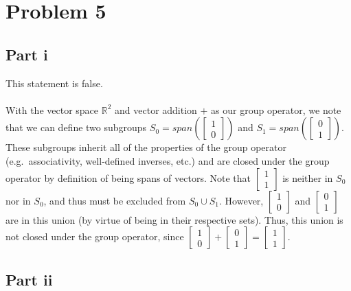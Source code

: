 \documentclass[letterpaper]{article}
\begin{document}
\section{Problem 5}
\label{sec:Problem5}

\subsection{Part i}
\label{subs:Parti}

This statement is false.
\\ \\
With the vector space $ \mathbb{R}^2 $ and vector addition $ + $ as our group operator, we note that we can define two subgroups $ S_0 = span\left(\begin{bmatrix} 1 \\ 0 \end{bmatrix}\right) $ and $ S_1 = span\left(\begin{bmatrix} 0 \\ 1 \end{bmatrix}\right) $.
These subgroups inherit all of the properties of the group operator (e.g.\ associativity, well-defined inverses, etc.) and are closed under the group operator by definition of being spans of vectors.
Note that $ \begin{bmatrix} 1 \\ 1 \end{bmatrix} $ is neither in $ S_0 $ nor in $ S_0 $, and thus must be excluded from $ S_0 \cup S_1 $. However, $ \begin{bmatrix} 1 \\ 0 \end{bmatrix} $ and $ \begin{bmatrix} 0 \\ 1 \end{bmatrix} $ are in this union (by virtue of being in their respective sets).
Thus, this union is not closed under the group operator, since $ \begin{bmatrix} 1 \\ 0 \end{bmatrix} + \begin{bmatrix} 0 \\ 1 \end{bmatrix} = \begin{bmatrix} 1 \\ 1 \end{bmatrix} $.

\subsection{Part ii}
\label{subs:Partii}
\end{document}
